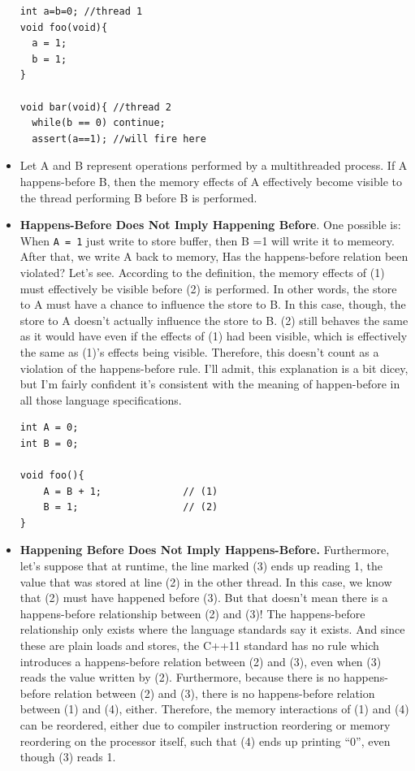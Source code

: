\documentclass[a4paper,11pt,twoside]{book}
\begin{document}
\begin{itemize}
\begin{lstlisting}
int a=b=0; //thread 1
void foo(void){
  a = 1;
  b = 1;
}

void bar(void){ //thread 2
  while(b == 0) continue;
  assert(a==1); //will fire here
\end{lstlisting}

	\item Let A and B represent operations performed by a multithreaded process. If A happens-before B, then the memory effects of A effectively become visible to the thread performing B before B is performed.


	\item \textbf{Happens-Before Does Not Imply Happening Before}. One possible is: When \texttt{A = 1} just write to store buffer, then B =1 will write it to memeory. After that, we write A back to memory, Has the happens-before relation been violated? Let’s see. According to the definition, the memory effects of (1) must effectively be visible before (2) is performed. In other words, the store to A must have a chance to influence the store to B. In this case, though, the store to A doesn’t actually influence the store to B. (2) still behaves the same as it would have even if the effects of (1) had been visible, which is effectively the same as (1)’s effects being visible. Therefore, this doesn’t count as a violation of the happens-before rule. I’ll admit, this explanation is a bit dicey, but I’m fairly confident it’s consistent with the meaning of happen-before in all those language specifications.

\begin{lstlisting}
int A = 0;
int B = 0;

void foo(){
    A = B + 1;              // (1)
    B = 1;                  // (2)
}
\end{lstlisting}

	\item \textbf{Happening Before Does Not Imply Happens-Before.} Furthermore, let’s suppose that at runtime, the line marked (3) ends up reading 1, the value that was stored at line (2) in the other thread. In this case, we know that (2) must have happened before (3). But that doesn’t mean there is a happens-before relationship between (2) and (3)! The happens-before relationship only exists where the language standards say it exists. And since these are plain loads and stores, the C++11 standard has no rule which introduces a happens-before relation between (2) and (3), even when (3) reads the value written by (2). Furthermore, because there is no happens-before relation between (2) and (3), there is no happens-before relation between (1) and (4), either. Therefore, the memory interactions of (1) and (4) can be reordered, either due to compiler instruction reordering or memory reordering on the processor itself, such that (4) ends up printing “0”, even though (3) reads 1.
		

\end{itemize}
\end{document}
